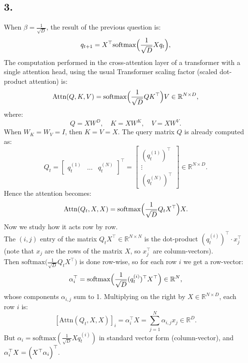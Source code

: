 \documentclass[12pt,a4paper]{article}
\begin{document}
    \subsection{3.}
        When \(\beta = \frac{1}{\sqrt{D}}\), the result of the previous question is:
        \[
            q_{t+1} = X^\top \mathrm{softmax} \Bigl( \frac{1}{\sqrt{D}} X q_t \Bigr),
        \]
        The computation performed in the cross-attention layer of a transformer with a single attention head, using the usual Transformer scaling factor (scaled dot-product attention) is:
        \[
            \text{Attn}(Q, K, V) = \mathrm{softmax} \Bigl( \frac{1}{\sqrt{D}} Q K^\top \Bigr) V \in \mathbb{R}^{N \times D},
        \]
        where:
        \[
            Q = X W^D, \quad K = X W^K, \quad V = X W^V.
        \]
        When \(W_K = W_V = I\), then \(K = V = X\). The query matrix \(Q\) is already computed as:
        \[
            Q_t =
            \begin{bmatrix}
            q_{t}^{(1)} & \hdots & q_{t}^{(N)}
            \end{bmatrix}^\top
            =
            \begin{bmatrix}
            (q_{t}^{(1)})^\top \\
            \vdots \\
            (q_{t}^{(N)})^\top
            \end{bmatrix}
            \in \mathbb{R}^{N \times D}.
        \]
        Hence the attention becomes:
        \[
            \text{Attn}(Q_t, X, X) = \mathrm{softmax} \Bigl( \frac{1}{\sqrt{D}} Q_t X^\top \Bigr) X.
        \]
        Now we study how it acts row by row. \\        
        The \((i,j)\) entry of the matrix \(Q_t X^\top \in \mathbb{R}^{N\times N}\) is the dot-product \((q_t^{(i)})^\top \cdot x_j^\top\) (note that \(x_j\) are the rows of the matrix \(X\), so \(x_j^\top\) are column-vectors). \\
        Then \(\mathrm{softmax} \bigl( \frac{1}{\sqrt{D}} Q_t X^\top \bigr)\) is done row-wise, so for each row \(i\) we get a row-vector:
        \[
            \alpha_i^\top = \mathrm{softmax} \Bigl( \frac{1}{\sqrt{D}} (q_t^{(i)})^\top X^\top \Bigr) \in \mathbb{R}^N,
        \]
        whose components \(\alpha_{i,j}\) sum to 1. Multiplying on the right by \(X\in\mathbb{R}^{N\times D}\), each row \(i\) is:
        \[
        [\text{Attn}(Q_t, X, X)]_i = \alpha_i^\top X = \sum_{j=1}^N \alpha_{i,j} x_j \in \mathbb{R}^D.
        \]
        But \(\alpha_i = \mathrm{softmax} (\frac{1}{\sqrt{D}} X q_t^{(i)})\) in standard vector form (column-vector), and \(\alpha_i^\top X = \Bigl( X^\top \alpha_i \Bigr)^\top.\) \\
\end{document}
